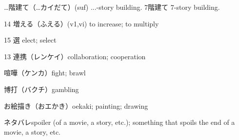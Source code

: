 …階建て（…カイだて）(suf) ...-story building.
7階建て 7-story building.

14 増える（ふえる）(v1,vi) to increase; to multiply

15 選 elect; select

13 連携（レンケイ）collaboration; cooperation

喧嘩（ケンカ）fight; brawl

博打（バクチ）gambling

お絵描き（おエかき）oekaki; painting; drawing

ネタバレspoiler (of a movie, a story, etc.); something that spoils the end of a movie, a story, etc.

